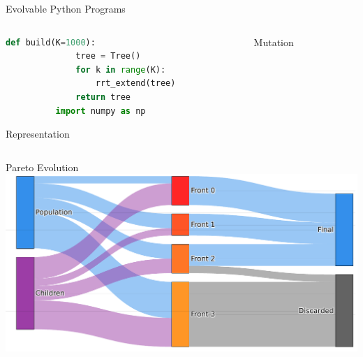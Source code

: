 \documentclass[aspectratio=169]{beamer}
\begin{document}
\begin{frame}{Evolvable Python Programs}
  \begin{columns}[T]
      \begin{column}{.5\linewidth}
      \begin{lstlisting}[language=Python]
          def build(K=1000):
              tree = Tree()
              for k in range(K):
                  rrt_extend(tree)
              return tree
          import numpy as np
      \end{lstlisting}
      Representation
      \end{column}
      \begin{column}{.5\linewidth}
      Mutation
      \end{column}
  \end{columns}
\end{frame}

\begin{frame}{Pareto Evolution}
    \includegraphics[width=1.0\linewidth, keepaspectratio]{figures/paretoev.pdf}
\end{frame}
\end{document}
